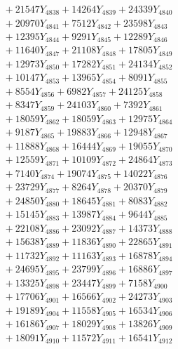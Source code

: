 \documentclass[a4paper,10pt]{article}
\begin{document}
{\begin{align}
&\;  + 21547 Y_{4838} + 14264 Y_{4839} + 24339 Y_{4840} \\[0.3ex]
&\;  + 20970 Y_{4841} + 7512 Y_{4842} + 23598 Y_{4843} \\[0.3ex]
&\;  + 12395 Y_{4844} + 9291 Y_{4845} + 12289 Y_{4846} \\[0.3ex]
&\;  + 11640 Y_{4847} + 21108 Y_{4848} + 17805 Y_{4849} \\[0.3ex]
&\;  + 12973 Y_{4850} + 17282 Y_{4851} + 24134 Y_{4852} \\[0.3ex]
&\;  + 10147 Y_{4853} + 13965 Y_{4854} + 8091 Y_{4855} \\[0.3ex]
&\;  + 8554 Y_{4856} + 6982 Y_{4857} + 24125 Y_{4858} \\[0.5ex]\allowbreak
&\;  + 8347 Y_{4859} + 24103 Y_{4860} + 7392 Y_{4861} \\[0.3ex]
&\;  + 18059 Y_{4862} + 18059 Y_{4863} + 12975 Y_{4864} \\[0.3ex]
&\;  + 9187 Y_{4865} + 19883 Y_{4866} + 12948 Y_{4867} \\[0.3ex]
&\;  + 11888 Y_{4868} + 16444 Y_{4869} + 19055 Y_{4870} \\[0.3ex]
&\;  + 12559 Y_{4871} + 10109 Y_{4872} + 24864 Y_{4873} \\[0.3ex]
&\;  + 7140 Y_{4874} + 19074 Y_{4875} + 14022 Y_{4876} \\[0.3ex]
&\;  + 23729 Y_{4877} + 8264 Y_{4878} + 20370 Y_{4879} \\[0.3ex]
&\;  + 24850 Y_{4880} + 18645 Y_{4881} + 8083 Y_{4882} \\[0.3ex]
&\;  + 15145 Y_{4883} + 13987 Y_{4884} + 9644 Y_{4885} \\[0.3ex]
&\;  + 22108 Y_{4886} + 23092 Y_{4887} + 14373 Y_{4888} \\[0.5ex]\allowbreak
&\;  + 15638 Y_{4889} + 11836 Y_{4890} + 22865 Y_{4891} \\[0.3ex]
&\;  + 11732 Y_{4892} + 11163 Y_{4893} + 16878 Y_{4894} \\[0.3ex]
&\;  + 24695 Y_{4895} + 23799 Y_{4896} + 16886 Y_{4897} \\[0.3ex]
&\;  + 13325 Y_{4898} + 23447 Y_{4899} + 7158 Y_{4900} \\[0.3ex]
&\;  + 17706 Y_{4901} + 16566 Y_{4902} + 24273 Y_{4903} \\[0.3ex]
&\;  + 19189 Y_{4904} + 11558 Y_{4905} + 16534 Y_{4906} \\[0.3ex]
&\;  + 16186 Y_{4907} + 18029 Y_{4908} + 13826 Y_{4909} \\[0.3ex]
&\;  + 18091 Y_{4910} + 11572 Y_{4911} + 16541 Y_{4912} \\[0.3ex]

\end{align}}
\end{document}
